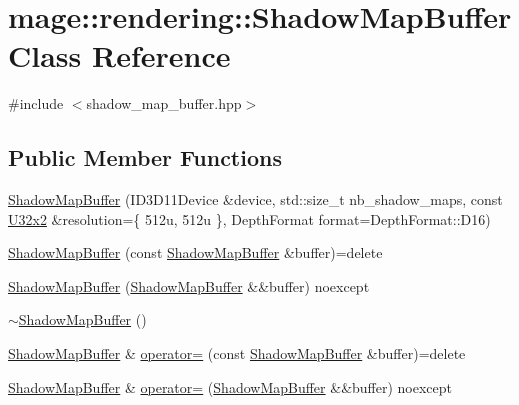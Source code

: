 \hypertarget{classmage_1_1rendering_1_1_shadow_map_buffer}{}\section{mage\+:\+:rendering\+:\+:Shadow\+Map\+Buffer Class Reference}
\label{classmage_1_1rendering_1_1_shadow_map_buffer}


{\ttfamily \#include $<$shadow\+\_\+map\+\_\+buffer.\+hpp$>$}

\subsection*{Public Member Functions}
\begin{DoxyCompactItemize}
\item 
\mbox{\hyperlink{classmage_1_1rendering_1_1_shadow_map_buffer_a0e0f9fc6a66cb302e1c5da4f45da04d9}{Shadow\+Map\+Buffer}} (I\+D3\+D11\+Device \&device, std\+::size\+\_\+t nb\+\_\+shadow\+\_\+maps, const \mbox{\hyperlink{namespacemage_ae5e7ccf8a1785baaacf57b3a0f4324e2}{U32x2}} \&resolution=\{ 512u, 512u \}, Depth\+Format format=\+Depth\+Format\+::\+D16)
\item 
\mbox{\hyperlink{classmage_1_1rendering_1_1_shadow_map_buffer_a9468f0c15337f9036238233fa17bbcd2}{Shadow\+Map\+Buffer}} (const \mbox{\hyperlink{classmage_1_1rendering_1_1_shadow_map_buffer}{Shadow\+Map\+Buffer}} \&buffer)=delete
\item 
\mbox{\hyperlink{classmage_1_1rendering_1_1_shadow_map_buffer_ac7e9131739e3ec2781d4d445cea906f4}{Shadow\+Map\+Buffer}} (\mbox{\hyperlink{classmage_1_1rendering_1_1_shadow_map_buffer}{Shadow\+Map\+Buffer}} \&\&buffer) noexcept
\item 
\mbox{\hyperlink{classmage_1_1rendering_1_1_shadow_map_buffer_afdce2b148b1ecca6a29db3f5019a8f7a}{$\sim$\+Shadow\+Map\+Buffer}} ()
\item 
\mbox{\hyperlink{classmage_1_1rendering_1_1_shadow_map_buffer}{Shadow\+Map\+Buffer}} \& \mbox{\hyperlink{classmage_1_1rendering_1_1_shadow_map_buffer_a51f61c027adeb55d39767f1be36dd404}{operator=}} (const \mbox{\hyperlink{classmage_1_1rendering_1_1_shadow_map_buffer}{Shadow\+Map\+Buffer}} \&buffer)=delete
\item 
\mbox{\hyperlink{classmage_1_1rendering_1_1_shadow_map_buffer}{Shadow\+Map\+Buffer}} \& \mbox{\hyperlink{classmage_1_1rendering_1_1_shadow_map_buffer_a09a2616afc836a3c8c21347a4473eb08}{operator=}} (\mbox{\hyperlink{classmage_1_1rendering_1_1_shadow_map_buffer}{Shadow\+Map\+Buffer}} \&\&buffer) noexcept

\end{DoxyCompactItemize}
